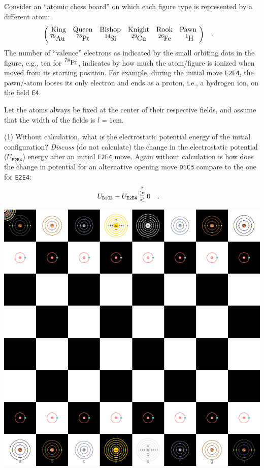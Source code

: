 \documentclass{article} %
\begin{document}
\begin{question}
        Consider an ``atomic chess board'' on which each figure type is represented by a different atom:
        \[
        \mqty(~
        \text{King} & \text{Queen} & \text{Bishop} & \text{Knight} & \text{Rook} & \text{Pawn}~ \\
        \ce{^{79}Au}& \ce{^{78}Pt} & \ce{^{14}Si} & \ce{^{29}Cu} & \ce{^{26}Fe} & \ce{^{1}H}
        )
        \qq{.}
        \]
        The number of ``valence'' electrons as indicated by the small orbiting dots in the figure, e.g.,
        ten for $\ce{^{78}Pt}$, indicates by how much the atom/figure is ionized when moved from its starting
        position. For example, during the initial move \texttt{E2E4}, the pawn/-atom looses its
        only electron and ends as a proton, i.e., a hydrogen ion, on the
        field \texttt{E4}.

        Let the atoms always be fixed at the center of their respective fields, and assume that
        the width of the fields is $l = 1$cm.
        \begin{tasks}(1)
                \task Without calculation, what is the electrostatic potential energy of the initial configuration?
                \task \emph{Discuss} (do not calculate) the change in the electrostatic potential ($U_\texttt{E2E4}$)
                 energy after an initial \texttt{E2E4} move.
                \task Again without calculation is how does the change in potential for an alternative opening
                move \texttt{D1C3} compare to the one for \texttt{E2E4}:
                \[
                U_\texttt{B1C3} - U_\texttt{E2E4} \stackrel{?}{\gtreqqless}0 \qq{.}
                \]
        \end{tasks}
        

\includegraphics[width=1.\textwidth]{atomic_chess_board.pdf}

\end{question}

\printnomenclature

\renewcommand\refname{Recommended Reading}

\nocite{*}


\end{document}
